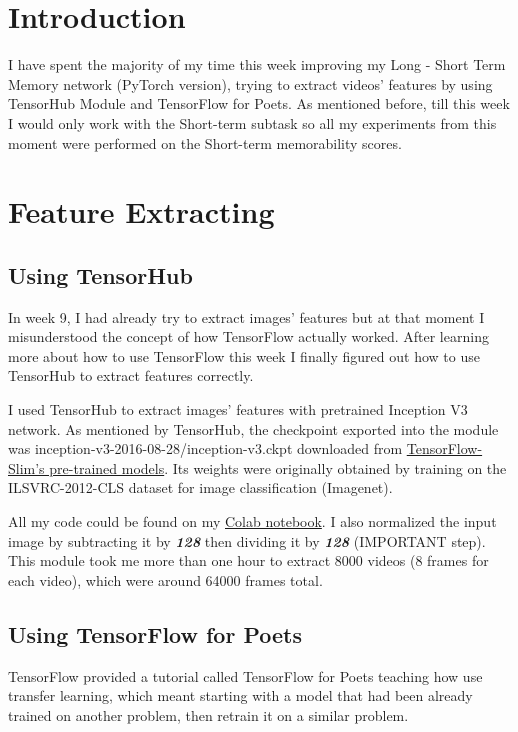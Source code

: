 \section{Introduction}
I have spent the majority of my time this week improving my Long - Short Term Memory network (PyTorch version), trying to extract videos' features by using TensorHub Module\cite{tensorhub} and TensorFlow for Poets\cite{tf4poets}. As mentioned before, till this week I would only work with the Short-term subtask so all my experiments from this moment were performed on the Short-term memorability scores.

\section{Feature Extracting}
\subsection{Using TensorHub}
In week 9, I had already try to extract images' features but at that moment I misunderstood the concept of how TensorFlow actually worked. After learning more about how to use TensorFlow this week I finally figured out how to use TensorHub to extract features correctly.

I used TensorHub to extract images' features with pretrained Inception V3 network. As mentioned by TensorHub, the checkpoint exported into the module was inception-v3-2016-08-28/inception-v3.ckpt downloaded from \href{https://github.com/tensorflow/models/blob/master/research/slim/README.md#pre-trained-models}{TensorFlow-Slim's pre-trained models}. Its weights were originally obtained by training on the ILSVRC-2012-CLS dataset for image classification (Imagenet).

All my code could be found on my \href{https://colab.research.google.com/drive/1mL2fH6zuTS-8o1Z6oKtmF1Mt-6f32LsX}{Colab notebook}. I also normalized the input image by subtracting it by \textbf{\emph{128}} then dividing it by \textbf{\emph{128}} (IMPORTANT step). This module took me more than one hour to extract 8000 videos (8 frames for each video), which were around 64000 frames total.

\subsection{Using TensorFlow for Poets}
TensorFlow provided a tutorial called TensorFlow for Poets teaching how use transfer learning, which meant starting with a model that had been already trained on another problem, then retrain it on a similar problem.

